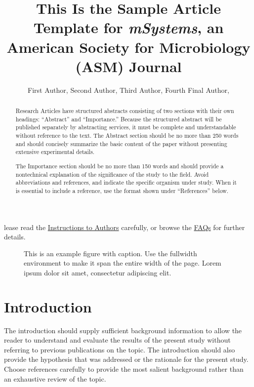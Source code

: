\documentclass[lineno]{asm-article}
\title{This Is the Sample Article Template for \textit{mSystems}\textsuperscript{\textregistered}, an American Society for Microbiology (ASM) Journal}
\author{%
  First Author,\afn{a}
  Second Author,\afn{a,\authfn{2}}
  Third Author,\afn{b}
  Fourth Final Author,\afn{a,b,\authfn{1}}
}
\affil{%
  University Name, Faculty Group, Department, City, Country\afn{a};
  Company Name, City, Country\afn{b}
}
\begin{document}
\maketitle


\begin{abstract}
Research Articles have structured abstracts consisting of two sections with their own headings: ``Abstract'' and ``Importance.'' Because the structured abstract will be published separately by abstracting services, it must be complete and understandable without reference to the text. The Abstract section should be no more than 250 words and should  concisely  summarize  the  basic  content  of  the  paper without presenting extensive experimental details.

\begin{importance}
The Importance section should be no more than 150 words and should provide a nontechnical explanation of the significance of the study to the field. Avoid abbreviations and references, and indicate the specific organism under study. When it is essential to include a reference, use the format shown under ``References'' below.
\end{importance}

\end{abstract}


lease read the \href{http://journalitas.asm.org/t/175157-msystems-ita}{Instructions to Authors} carefully, or browse the \href{http://msystems.asm.org/content/faq}{FAQs} for further details.

\begin{figure}[bp!]
\begin{fullwidth}
\caption{This is an example figure with caption. Use the fullwidth environment to make it span the entire width of the page. Lorem ipsum dolor sit amet, consectetur adipiscing elit.}
\end{fullwidth}
\end{figure}


\section{Introduction}

The introduction should supply sufficient background information to allow the reader to understand and evaluate the results of the present study without referring to previous publications on the topic. The introduction should also provide the hypothesis that was addressed or the rationale for the present study. Choose references carefully to provide the most salient background rather than an exhaustive review of the topic.
\end{document}
